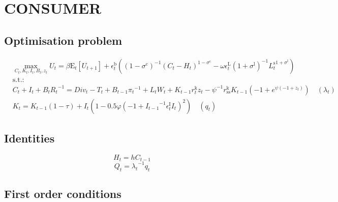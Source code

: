 

\section{CONSUMER}

\subsection{Optimisation problem}

\begin{align}
&\max_{C_{t}, K_{t}, I_{t}, B_{t}, z_{t}
} U_{t} = {\beta} {\mathrm{E}_{t}\left[U_{t+1}\right]} + {\epsilon^{\mathrm{b}}_{t}} \left(\left(1 - \sigma^{\mathrm{c}}\right)^{-1} {\left(C_{t} - H_{t}\right)^{1 - \sigma^{\mathrm{c}}}} - {\omega} {\epsilon^{\mathrm{L}}_{t}} \left(1 + \sigma^{\mathrm{l}}\right)^{-1} {{L^{\mathrm{s}}_{t}}^{1 + \sigma^{\mathrm{l}}}}\right)\\
&\mathrm{s.t.:}\nonumber\\
& C_{t} + I_{t} + {B_{t}} {R_{t}}^{-1} = {D\!i\!v}_{t} - T_{t} + {B_{t-1}} {\pi_{t}}^{-1} + {L_{t}} {W_{t}} + {K_{t-1}} {r^{\mathrm{k}}_{t}} {z_{t}} - {\psi}^{-1} {r^{\mathrm{k}}_\mathrm{ss}} {K_{t-1}} \left(-1 + e^{{\psi} \left(-1 + z_{t}\right)}\right) \quad \left(\lambda_{t}\right)\\
& K_{t} = {K_{t-1}} \left(1 - \tau\right) + {I_{t}} \left(1 - 0.5{\varphi} \left(-1 + {I_{t-1}}^{-1} {\epsilon^{\mathrm{I}}_{t}} {I_{t}}\right)^{2}\right) \quad \left(q_{t}\right)
\end{align}


\subsection{Identities}

\begin{equation}
H_{t} = {h} {C_{t-1}}
\end{equation}
\begin{equation}
Q_{t} = {\lambda_{t}}^{-1} {q_{t}}
\end{equation}


\subsection{First order conditions}

